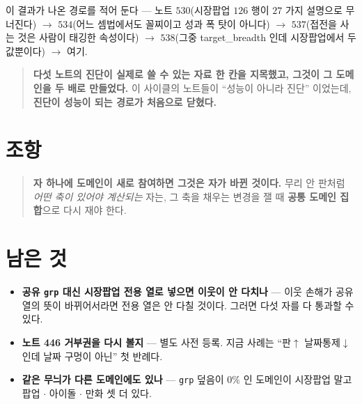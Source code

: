 \documentclass[11pt]{article}
\begin{document}
이 결과가 나온 경로를 적어 둔다 --- 노트 $530$(시장팝업 $126$ 행이 $27$ 가지
설명으로 무너진다) $\to$ $534$(어느 셈법에서도 꼴찌이고 성과 폭 탓이 아니다)
$\to$ $537$(접전을 사는 것은 사람이 태깅한 속성이다) $\to$ $538$(그중
target\_breadth 인데 시장팝업에서 두 값뿐이다) $\to$ 여기.

\begin{quote}
\textbf{다섯 노트의 진단이 실제로 쓸 수 있는 자료 한 칸을 지목했고, 그것이
그 도메인을 두 배로 만들었다.} 이 사이클의 노트들이 ``성능이 아니라 진단''
이었는데, \textbf{진단이 성능이 되는 경로가 처음으로 닫혔다.}
\end{quote}

\section*{조항}

\begin{quote}
\textbf{자 하나에 도메인이 새로 참여하면 그것은 자가 바뀐 것이다.} 무리 안
판처럼 \emph{어떤 축이 있어야 계산되는} 자는, 그 축을 채우는 변경을 잴 때
\textbf{공통 도메인 집합}으로 다시 재야 한다.
\end{quote}

\section*{남은 것}

\begin{itemize}
\item \textbf{공유 \texttt{grp} 대신 시장팝업 전용 열로 넣으면 이웃이 안
다치나} --- 이웃 손해가 공유 열의 뜻이 바뀌어서라면 전용 열은 안 다칠 것이다.
그러면 다섯 자를 다 통과할 수 있다.
\item \textbf{노트 446 거부권을 다시 볼지} --- 별도 사전 등록. 지금 사례는
``판$\uparrow$ 날짜통제$\downarrow$ 인데 날짜 구멍이 아닌'' 첫 반례다.
\item \textbf{같은 무늬가 다른 도메인에도 있나} --- \texttt{grp} 덮음이 $0\%$
인 도메인이 시장팝업 말고 팝업 $\cdot$ 아이돌 $\cdot$ 만화 셋 더 있다.
\end{itemize}
\end{document}
